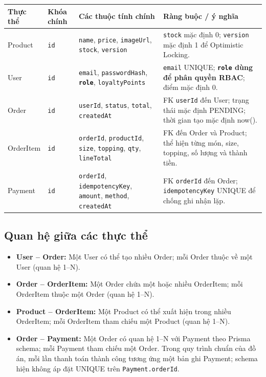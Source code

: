 \begin{center}
\renewcommand{\arraystretch}{1.18}
\begin{tabular}{|p{2.0cm}|p{2.2cm}|p{6.0cm}|p{3.4cm}|}
\hline
\textbf{Thực thể} & \textbf{Khóa chính} & \textbf{Các thuộc tính chính} & \textbf{Ràng buộc / ý nghĩa} \\
\hline
Product & \texttt{id} & \texttt{name}, \texttt{price}, \texttt{imageUrl}, \texttt{stock}, \texttt{version} & \texttt{stock} mặc định 0; \texttt{version} mặc định 1 để Optimistic Locking. \\
\hline
User & \texttt{id} & \texttt{email}, \texttt{passwordHash}, \textbf{\texttt{role}}, \texttt{loyaltyPoints} & \texttt{email} UNIQUE; \textbf{\texttt{role} dùng để phân quyền RBAC}; điểm mặc định 0. \\
\hline
Order & \texttt{id} & \texttt{userId}, \texttt{status}, \texttt{total}, \texttt{createdAt} & FK \texttt{userId} đến User; trạng thái mặc định PENDING; thời gian tạo mặc định now(). \\
\hline
OrderItem & \texttt{id} & \texttt{orderId}, \texttt{productId}, \texttt{size}, \texttt{topping}, \texttt{qty}, \texttt{lineTotal} & FK đến Order và Product; thể hiện từng món, size, topping, số lượng và thành tiền. \\
\hline
Payment & \texttt{id} & \texttt{orderId}, \texttt{idempotencyKey}, \texttt{amount}, \texttt{method}, \texttt{createdAt} & FK \texttt{orderId} đến Order; \texttt{idempotencyKey} UNIQUE để chống ghi nhận lặp. \\
\hline
\end{tabular}
\end{center}

\subsection{Quan hệ giữa các thực thể}

\begin{itemize}
    \item \textbf{User -- Order:} Một User có thể tạo nhiều Order; mỗi Order thuộc về một User (quan hệ 1--N).
    \item \textbf{Order -- OrderItem:} Một Order chứa một hoặc nhiều OrderItem; mỗi OrderItem thuộc một Order (quan hệ 1--N).
    \item \textbf{Product -- OrderItem:} Một Product có thể xuất hiện trong nhiều OrderItem; mỗi OrderItem tham chiếu một Product (quan hệ 1--N).
    \item \textbf{Order -- Payment:} Một Order có quan hệ 1--N với Payment theo Prisma schema; mỗi Payment tham chiếu một Order. Trong quy trình chuẩn của đồ án, mỗi lần thanh toán thành công tương ứng một bản ghi Payment; schema hiện không áp đặt UNIQUE trên \texttt{Payment.orderId}.
\end{itemize}

